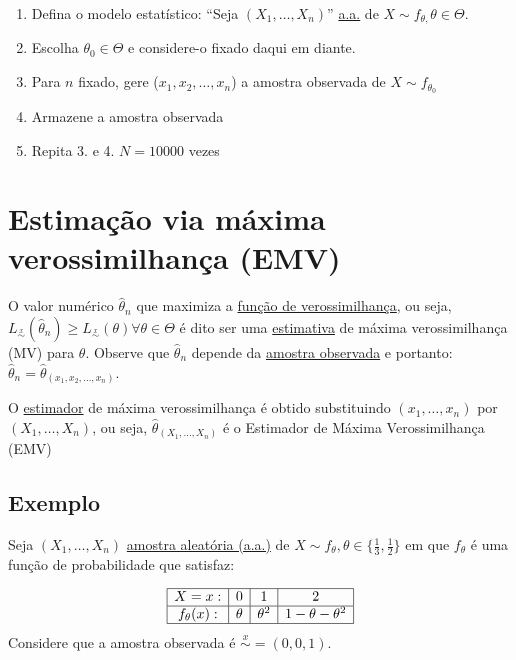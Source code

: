 \documentclass[
  letterpaper,
  DIV=11,
  numbers=noendperiod]{scrreprt}
\providecommand{\tightlist}{%
  \setlength{\itemsep}{0pt}\setlength{\parskip}{0pt}}\usepackage{longtable,booktabs,array}
\begin{document}
\begin{enumerate}
\def\labelenumi{\arabic{enumi}.}
\tightlist
\item
  Defina o modelo estatístico: ``Seja \((X_{1},\dots,X_{n})\)''
  \hyperref[sec-aa]{a.a.} de \(X\sim f_{\theta,}\theta \in \Theta\).
\item
  Escolha \(\theta_{0} \in \Theta\) e considere-o fixado daqui em
  diante.
\item
  Para \(n\) fixado, gere (\(x_{1}, x_{2},\dots,x_{n}\)) a amostra
  observada de \(X\sim f_{\theta_{0}}\)
\item
  Armazene a amostra observada
\item
  Repita 3. e 4. \(N=10000\) vezes
\end{enumerate}


\chapter{Estimação via máxima verossimilhança
(EMV)}\label{estimauxe7uxe3o-via-muxe1xima-verossimilhanuxe7a-emv}

O valor numérico \(\hat\theta_{n}\) que maximiza a
\href{funcao-verossimilhanca.qmd}{função de verossimilhança}, ou seja,
\(L_{\stackrel{x}{\sim}}(\hat\theta_{n}) \geq L_{\stackrel{x}{\sim}}(\theta)\forall \theta \in \Theta\)
é dito ser uma \hyperref[estimativas]{estimativa} de máxima
verossimilhança (MV) para \(\theta\). Observe que \(\hat\theta_{n}\)
depende da \hyperref[sec-ao]{amostra observada} e portanto:
\(\hat\theta_{n} = \hat\theta_(x_{1},x_{2},\dots,x_{n})\).

O \href{estimadores.qmd}{estimador} de máxima verossimilhança é obtido
substituindo \((x_{1},\dots,x_{n})\) por \((X_{1},\dots,X_{n})\), ou
seja, \(\hat\theta_{(X_{1},\dots,X_{n})}\) é o Estimador de Máxima
Verossimilhança (EMV)

\section{Exemplo}\label{exemplo-3}

Seja \((X_{1},\dots,X_{n})\) \hyperref[sec-aa]{amostra aleatória (a.a.)}
de \(X\sim f_{\theta}, \theta \in \{\frac{1}{3}, \frac{1}{2} \}\) em que
\(f_\theta\) é uma função de probabilidade que satisfaz:

\[
\begin{array}{|c|c|c|c|}
\hline
X=x: & 0 & 1 & 2\\
\hline
f_{\theta}(x): & \theta & \theta^{2} & 1-\theta-\theta^{2}\\
\hline
\end{array}
\] Considere que a amostra observada é \(\stackrel{x}{\sim}=(0,0,1)\).
\end{document}
